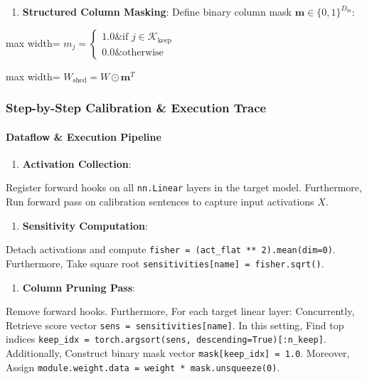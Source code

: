 \begin{enumerate}
\item \textbf{Structured Column Masking}:
Define binary column mask $\mathbf{m} \in \{0, 1\}^{D_{\text{in}}}$:
\end{enumerate}
\begin{center}
\begin{adjustbox}{max width=\columnwidth}
$\displaystyle
m_j = \begin{cases} 1.0 \& \text{if } j \in \mathcal{K}_{\text{keep}} \\ 0.0 \& \text{otherwise} \end{cases}
$
\end{adjustbox}
\end{center}
\begin{center}
\begin{adjustbox}{max width=\columnwidth}
$\displaystyle
W_{\text{shed}} = W \odot \mathbf{m}^T
$
\end{adjustbox}
\end{center}


\subsubsection*{Step-by-Step Calibration \& Execution Trace}

\paragraph{Dataflow \& Execution Pipeline}

\begin{enumerate}
\item \textbf{Activation Collection}:
\end{enumerate}
Register forward hooks on all \texttt{nn.Linear} layers in the target model. Furthermore, Run forward pass on calibration sentences to capture input activations $X$.

\begin{enumerate}
\item \textbf{Sensitivity Computation}:
\end{enumerate}
Detach activations and compute \texttt{fisher = (act\_flat ** 2).mean(dim=0)}. Furthermore, Take square root \texttt{sensitivities[name] = fisher.sqrt()}.

\begin{enumerate}
\item \textbf{Column Pruning Pass}:
\end{enumerate}
Remove forward hooks. Furthermore, For each target linear layer: Concurrently, Retrieve score vector \texttt{sens = sensitivities[name]}. In this setting, Find top indices \texttt{keep\_idx = torch.argsort(sens, descending=True)[:n\_keep]}. Additionally, Construct binary mask vector \texttt{mask[keep\_idx] = 1.0}. Moreover, Assign \texttt{module.weight.data = weight * mask.unsqueeze(0)}.


